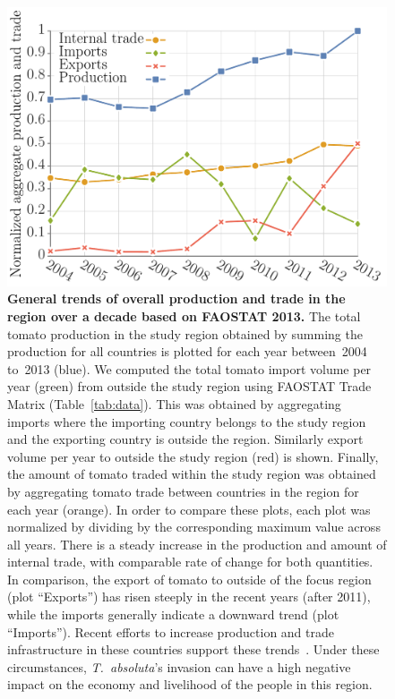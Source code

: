 \documentclass[10pt]{article}
\theoremstyle{definition}
\newcommand{\tuta}{\emph{T.~absoluta}}
\begin{document}
\begin{figure}[!ht]
    \centering
    \includegraphics[width=.7\textwidth]
    {../international_trade/results/stat_plots/trends.pdf}
\caption{\textbf{General trends of overall production and trade in the
region over a decade based on FAOSTAT 2013.} The total tomato production in
the study region obtained by summing the production for all countries is
plotted for each year between~2004 to~2013 (blue). We computed the total
tomato import volume per year (green) from outside the study region using
FAOSTAT Trade Matrix (Table~\ref{tab:data}). This was obtained by
aggregating imports where the importing country belongs to the study region
and the exporting country is outside the region. Similarly export volume
per year to outside the study region (red) is shown. Finally, the amount of
tomato traded within the study region was obtained by aggregating tomato
trade between countries in the region for each year (orange). In order to
compare these plots, each plot was normalized by dividing by the
corresponding maximum value across all years.
There is a steady
increase in the production and amount of internal trade, with comparable
rate of change for both quantities.  In comparison, the export of tomato to
outside of the focus region (plot ``Exports'') has risen steeply in the
recent years (after 2011), while the imports generally indicate a downward trend (plot
``Imports''). Recent efforts to increase production and trade
infrastructure in these countries support these 
trends~\cite{huong2013,buntong2013,moustier2007}.
Under these circumstances, \tuta{}'s invasion can have a high negative
impact on the economy and livelihood of the people in this region.
\label{fig:trends}} 
\end{figure}
\end{document}
